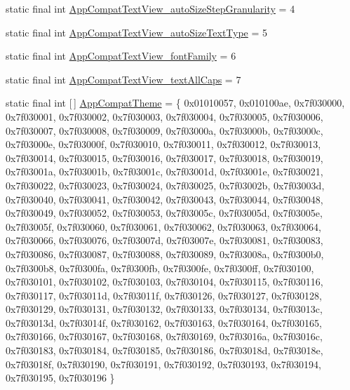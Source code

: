 \begin{DoxyCompactItemize}
\item 
static final int \mbox{\hyperlink{classandroid_1_1support_1_1v7_1_1appcompat_1_1R_1_1styleable_a00ceb02e6607ab5a8647a0bde31d0886}{App\+Compat\+Text\+View\+\_\+auto\+Size\+Step\+Granularity}} = 4
\item 
static final int \mbox{\hyperlink{classandroid_1_1support_1_1v7_1_1appcompat_1_1R_1_1styleable_a2a4cfbddafe8f9631e4601bc88a22ec0}{App\+Compat\+Text\+View\+\_\+auto\+Size\+Text\+Type}} = 5
\item 
static final int \mbox{\hyperlink{classandroid_1_1support_1_1v7_1_1appcompat_1_1R_1_1styleable_a946326a59dbc73e28494b7f31003892e}{App\+Compat\+Text\+View\+\_\+font\+Family}} = 6
\item 
static final int \mbox{\hyperlink{classandroid_1_1support_1_1v7_1_1appcompat_1_1R_1_1styleable_a25380302d2eae707e18a64b87eb2d4aa}{App\+Compat\+Text\+View\+\_\+text\+All\+Caps}} = 7
\item 
static final int \mbox{[}$\,$\mbox{]} \mbox{\hyperlink{classandroid_1_1support_1_1v7_1_1appcompat_1_1R_1_1styleable_a5c42f89e8a410c323be34208d75c430b}{App\+Compat\+Theme}} = \{ 0x01010057, 0x010100ae, 0x7f030000, 0x7f030001, 0x7f030002, 0x7f030003, 0x7f030004, 0x7f030005, 0x7f030006, 0x7f030007, 0x7f030008, 0x7f030009, 0x7f03000a, 0x7f03000b, 0x7f03000c, 0x7f03000e, 0x7f03000f, 0x7f030010, 0x7f030011, 0x7f030012, 0x7f030013, 0x7f030014, 0x7f030015, 0x7f030016, 0x7f030017, 0x7f030018, 0x7f030019, 0x7f03001a, 0x7f03001b, 0x7f03001c, 0x7f03001d, 0x7f03001e, 0x7f030021, 0x7f030022, 0x7f030023, 0x7f030024, 0x7f030025, 0x7f03002b, 0x7f03003d, 0x7f030040, 0x7f030041, 0x7f030042, 0x7f030043, 0x7f030044, 0x7f030048, 0x7f030049, 0x7f030052, 0x7f030053, 0x7f03005c, 0x7f03005d, 0x7f03005e, 0x7f03005f, 0x7f030060, 0x7f030061, 0x7f030062, 0x7f030063, 0x7f030064, 0x7f030066, 0x7f030076, 0x7f03007d, 0x7f03007e, 0x7f030081, 0x7f030083, 0x7f030086, 0x7f030087, 0x7f030088, 0x7f030089, 0x7f03008a, 0x7f0300b0, 0x7f0300b8, 0x7f0300fa, 0x7f0300fb, 0x7f0300fe, 0x7f0300ff, 0x7f030100, 0x7f030101, 0x7f030102, 0x7f030103, 0x7f030104, 0x7f030115, 0x7f030116, 0x7f030117, 0x7f03011d, 0x7f03011f, 0x7f030126, 0x7f030127, 0x7f030128, 0x7f030129, 0x7f030131, 0x7f030132, 0x7f030133, 0x7f030134, 0x7f03013c, 0x7f03013d, 0x7f03014f, 0x7f030162, 0x7f030163, 0x7f030164, 0x7f030165, 0x7f030166, 0x7f030167, 0x7f030168, 0x7f030169, 0x7f03016a, 0x7f03016c, 0x7f030183, 0x7f030184, 0x7f030185, 0x7f030186, 0x7f03018d, 0x7f03018e, 0x7f03018f, 0x7f030190, 0x7f030191, 0x7f030192, 0x7f030193, 0x7f030194, 0x7f030195, 0x7f030196 \}
\item 

\end{DoxyCompactItemize}
